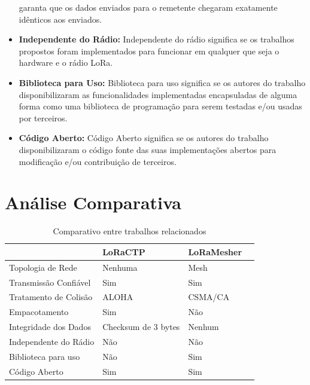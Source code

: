 \begin{itemize}
    garanta que os dados enviados para o remetente chegaram exatamente idênticos aos enviados.
    \item \textbf{Independente do Rádio:} Independente do rádio significa se os trabalhos propostos
    foram implementados para funcionar em qualquer que seja o hardware e o rádio LoRa.
    \item \textbf{Biblioteca para Uso:} Biblioteca para uso significa se os autores do trabalho
    disponibilizaram as funcionalidades implementadas encapsuladas de alguma forma como uma biblioteca
    de programação para serem testadas e/ou usadas por terceiros.
    \item \textbf{Código Aberto:} Código Aberto significa se os autores do trabalho disponibilizaram
    o código fonte das suas implementações abertos para modificação e/ou contribuição de terceiros.
\end{itemize}

\section{Análise Comparativa}

\begin{table}[H]
    \begin{center}
    \caption{Comparativo entre trabalhos relacionados}
    \label{table:rel-comp}
    \begin{tabular}{|l|l|l|l|}
    \hline
     & LoRaCTP & LoRaMesher \\
    \hline
    Topologia de Rede & Nenhuma & Mesh \\
    \hline
    Transmissão Confiável & Sim & Sim \\
    \hline
    Tratamento de Colisão & ALOHA & CSMA/CA \\
    \hline
    Empacotamento & Sim & Não \\
    \hline
    Integridade dos Dados & Checksum de 3 bytes & Nenhum \\
    \hline
    Independente do Rádio & Não & Não \\
    \hline
    Biblioteca para uso & Não & Sim \\
    \hline
    Código Aberto & Sim & Sim \\
    \hline
    \end{tabular}
    \end{center}
\end{table}